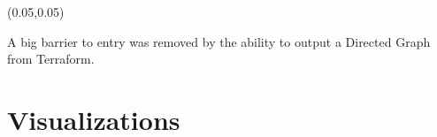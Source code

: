 \documentclass[aspectratio=169]{beamer} %
\begin{document}
\begin{frame}{}
    \setlength{\TPHorizModule}{\textwidth}
    \setlength{\TPVertModule}{\textwidth}
    \begin{textblock}{0.74}(0.05,0.05)
        \bfseries\large\textcolor{white}{Data Collection}
    \end{textblock}
    A big barrier to entry was removed by the ability to output a Directed Graph from Terraform.
\lstI
\end{frame}

\section{Visualizations}
\end{document}
